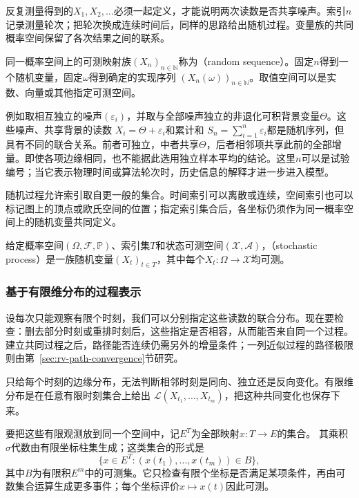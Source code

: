 反复测量得到的\(X_1,X_2,\ldots\)必须一起定义，才能说明两次读数是否共享噪声。索引\(n\)记录测量轮次；把轮次换成连续时间后，同样的思路给出随机过程。变量族的共同概率空间保留了各次结果之间的联系。
\begin{definition}[随机序列]
\label{def:rv-random-sequence}
同一概率空间上的可测映射族\((X_n)_{n\in\mathbb N}\)称为（random sequence）。固定\(n\)得到一个随机变量，固定\(\omega\)得到确定的实现序列
\((X_n(\omega))_{n\in\mathbb N}\)。取值空间可以是实数、向量或其他指定可测空间。
\end{definition}
例如取相互独立的噪声\((\varepsilon_i)\)，并取与全部噪声独立的非退化可积背景变量\(\Theta\)。这些噪声、共享背景的读数
\(X_i=\Theta+\varepsilon_i\)和累计和
\(S_n=\sum_{i=1}^n\varepsilon_i\)都是随机序列，但具有不同的联合关系。前者可独立，中者共享\(\Theta\)，后者相邻项共享此前的全部增量。即使各项边缘相同，也不能据此选用独立样本平均的结论。这里\(n\)可以是试验编号；当它表示物理时间或算法轮次时，历史信息的解释才进一步进入模型。

\label{sec:rv-paths}
随机过程允许索引取自更一般的集合。时间索引可以离散或连续，空间索引也可以标记图上的顶点或欧氏空间的位置；指定索引集合后，各坐标仍须作为同一概率空间上的随机变量共同定义。
\begin{definition}[随机过程]
  \label{def:stoch-process}
  给定概率空间\((\Omega,\mathcal F,\mathbb P)\)、索引集\(T\)和状态可测空间\((\mathcal X,\mathcal A)\)，（stochastic process）是一族随机变量\((X_t)_{t\in T}\)，其中每个\(X_t:\Omega\to\mathcal X\)均可测。
\end{definition}

\subsubsection{基于有限维分布的过程表示}
\label{sec:rv-finite-dimensional-laws}
设每次只能观察有限个时刻，我们可以分别指定这些读数的联合分布。现在要检查：删去部分时刻或重排时刻后，这些指定是否相容，从而能否来自同一个过程。建立共同过程之后，路径能否连续仍需另外的增量条件；一列近似过程的路径极限则由第~\ref{sec:rv-path-convergence}节研究。

只给每个时刻的边缘分布，无法判断相邻时刻是同向、独立还是反向变化。有限维分布是在任意有限时刻集合上给出
\(\mathcal L(X_{t_1},\ldots,X_{t_m})\)，把这种共同变化也保存下来。

要把这些有限观测放到同一个空间中，记\(E^T\)为全部映射\(x:T\to E\)的集合。
其乘积\(\sigma\)代数由有限坐标柱集生成；这类集合的形式是
\[
 \{x\in E^T:(x(t_1),\ldots,x(t_m))\in B\},
\]
其中\(B\)为有限积\(E^m\)中的可测集。它只检查有限个坐标是否满足某项条件，再由可数集合运算生成更多事件；每个坐标评价\(x\mapsto x(t)\)因此可测。

